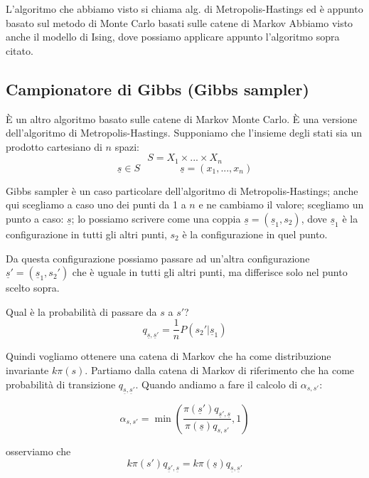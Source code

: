 \documentclass[a4paper,12pt]{book}
\begin{document}

L'algoritmo che abbiamo visto si chiama alg. di Metropolis-Hastings ed è appunto basato sul metodo di Monte Carlo basati sulle catene di Markov
Abbiamo visto anche il modello di Ising, dove possiamo applicare appunto l'algoritmo sopra citato. %

\subsection{Campionatore di Gibbs (Gibbs sampler)}
È un altro algoritmo basato sulle catene di Markov Monte Carlo. È una versione dell'algoritmo di Metropolis-Hastings. Supponiamo che l'insieme degli stati sia un prodotto cartesiano di $ n $ spazi: 
$$ S = X_1 \times ... \times X_n $$
$$ \underline{s} \in S \qquad \qquad \underline{s} = (x_1, ..., x_n) $$

Gibbs sampler è un caso particolare dell'algoritmo di Metropolis-Hastings; anche qui scegliamo a caso uno dei punti da 1 a $ n $ e ne cambiamo il valore; scegliamo un punto a caso: 
$ \underline{s} $; lo possiamo scrivere come una coppia $ \underline{s} = (\underline{s}_1, s_2) $, dove $ \underline{s}_1 $ è la configurazione in tutti gli altri punti, $ s_2 $ è la configurazione in quel punto. %

Da questa configurazione possiamo passare ad un'altra configurazione $ \underline{s}' = (\underline{s}_1, s_2') $ che è uguale in tutti gli altri punti, ma differisce solo nel punto scelto sopra. 

Qual è la probabilità di passare da $ s $ a $ s' $?
$$ q_{\underline{s}, \underline{s}'} = \frac{1}{n} P( s_2' | \underline{s}_1 )$$

Quindi vogliamo ottenere una catena di Markov che ha come distribuzione invariante $ k \pi(s) $. Partiamo dalla catena di Markov di riferimento che ha come probabilità di transizione $ q_{\underline{s}, \underline{s}'} $. Quando andiamo a fare il calcolo di $ \alpha_{s,s'} $:

$$ \alpha_{s,s'} = \min\left( \frac{\pi(\underline{s}')q_{\underline{s}', \underline{s}}}{\pi(\underline{s}) q_{s,s'}} , 1   \right) $$ 

osserviamo che 
$$ k\pi(s') q_{\underline{s}', \underline{s}} = k\pi(\underline{s}) q_{\underline{s}, \underline{s}'} $$
\end{document}
